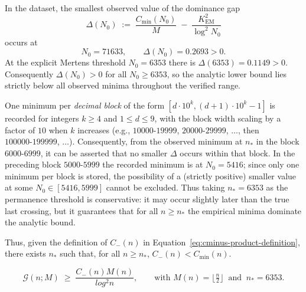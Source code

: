 \documentclass[11pt]{article}
\makeatletter
\theoremstyle{inline}
\theoremstyle{break}
\renewenvironment{proof}[1][\proofname]{%
  \par\pushQED{\qed}%
  \normalfont \topsep6\p@\@plus6\p@\relax
  \trivlist
  \item[\hskip\labelsep
        \itshape
    #1\@addpunct{.}]\mbox{}\\  %
}{%
  \popQED\endtrivlist\@endpefalse
}
\theoremstyle{break}
\theoremstyle{break}
\theoremstyle{break}
\theoremstyle{break}
\theoremstyle{break}
\theoremstyle{break}
\theoremstyle{inline}
\newcommand{\xPreMertens}{5416} %
\newcommand{\xMertens}{6353} %
\newcommand{\xNzeroStat}{71633} %
\newcommand{\xEtaStat}{0.2693} %
\newcommand{\xDeltaMertens}{0.1149}  %
\newcommand{\Cmeas}{C}              %
\newcommand{\CminusProduct}{C_{-}}
\newcommand{\Kem}{K_{\mathrm{EM}}}              %
\newcommand{\nprodstar}{n_{\ast}}  %
\makeatother
\begin{document}
\begin{proof}
In the dataset, the smallest observed value of the dominance gap 
\begin{equation}
\Delta(N_0)\;:=\;\frac{\Cmeas_{\min}(N_0)}{M}\;-\;\frac{\Kem^2}{\log^2 N_0}
\end{equation}
occurs at
\begin{equation}
N_0=\xNzeroStat,\qquad \Delta(N_0)=\xEtaStat>0.
\end{equation}
At the explicit Mertens threshold \(N_0=\xMertens\) there is
\(\Delta(\xMertens)=\xDeltaMertens>0\).
Consequently \(\Delta(N_0)>0\) for all \(N_0\ge \xMertens\), so the analytic
lower bound lies strictly below all observed minima throughout the verified range.

One minimum per \emph{decimal block} of the form
\([d\cdot 10^{k},(d+1)\cdot 10^{k}-1]\) is recorded for integers \(k\ge 4\) and \(1\le d\le 9\),
with the block width scaling by a factor of \(10\) when \(k\) increases (e.g.,
\(10000\text{-}19999\), \(20000\text{-}29999\), \(\dots\), then \(100000\text{-}199999\), \(\dots\)).
Consequently, from the observed minimum at \(\nprodstar\) in the block
\(6000\text{-}6999\), it can be asserted that no smaller \( \Delta \) occurs within that block.
In the preceding block \(5000\text{-}5999\) the recorded minimum is at \(N_0=\xPreMertens\);
since only one minimum per block is stored, the possibility of a
(strictly positive) smaller value at some \(N_0\in[\xPreMertens,5999]\) cannot be excluded. Thus taking
\(\nprodstar=\xMertens\) as the permanence threshold is conservative: it may occur
slightly later than the true last crossing, but it guarantees that for all
\(n\ge \nprodstar\) the empirical minima dominate the analytic bound.

\bigskip
\noindent
Thus, given the definition of \( \CminusProduct(n) \) in Equation~\ref{eq:cminus-product-definition}, there exists 
\( \nprodstar \) such that, for all \( n \ge \nprodstar\), \( \CminusProduct(n) < \Cmeas_{\min}(n)\).
  
\begin{equation}
  \mathcal{G}(n;M)\;\ge\;\frac{\CminusProduct(n)M(n)}{log^2 n},
  \qquad
  \text{with } M(n)=\bigl\lfloor \tfrac{n}{2} \bigr\rfloor
  \ \text{ and }\
  \nprodstar=\xMertens .
  \label{eq:analytic-lower-bound-global}
\end{equation}
\end{proof}
\end{document}
